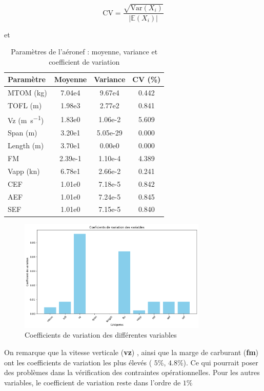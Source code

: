 \documentclass[a4paper, 11pt]{article}
\begin{document}
\begin{equation}
\text{CV} = \frac{\sqrt{\text{Var}(X_i)}}{|{\mathbb{E}(X_i)}|}
\end{equation}
\begin{table}[h]et
\centering
\caption{Paramètres de l'aéronef : moyenne, variance et coefficient de variation}
\begin{tabular}{l S[table-format=1.2e2] S[table-format=1.6e2] S[table-format=2.3]}
\toprule
\textbf{Paramètre} & \textbf{Moyenne} & \textbf{Variance} & \textbf{CV (\%)} \\
\midrule
MTOM (\si{\kilo\gram}) & 7.04e4 & 9.67e4 & 0.442 \\
TOFL (\si{\meter}) & 1.98e3 & 2.77e2 & 0.841 \\
Vz (\si{\meter\per\second}) & 1.83e0 & 1.06e-2 & 5.609 \\
Span (\si{\meter}) & 3.20e1 & 5.05e-29 & 0.000 \\
Length (\si{\meter}) & 3.70e1 & 0.00e0 & 0.000 \\
FM & 2.39e-1 & 1.10e-4 & 4.389 \\
Vapp (\si{\knot}) & 6.78e1 & 2.66e-2 & 0.241 \\
CEF & 1.01e0 & 7.18e-5 & 0.842 \\
AEF & 1.01e0 & 7.24e-5 & 0.845 \\
SEF & 1.01e0 & 7.15e-5 & 0.840 \\
\bottomrule
\end{tabular}
\end{table}

\begin{figure}[H]
\centering
\includegraphics[width=0.8\textwidth]{Images_Ayoub/Problem2/UseCase1/Estimating_Quantities/Coefficient_De_Variation/Coefficient_Variation.png}
\caption{Coefficients de variation des différentes variables}
\label{fig:image1}
\end{figure}
On remarque que la vitesse verticale (\textbf{vz}) , ainsi que la marge de carburant (\textbf{fm}) ont les coefficients de variation les plus élevés ( $5$\%, $4.8$\%). Ce qui pourrait poser des problèmes dans la vérification des contraintes opérationnelles. Pour les autres variables, le coefficient de variation reste dans l'ordre de $1\%$
\end{document}
